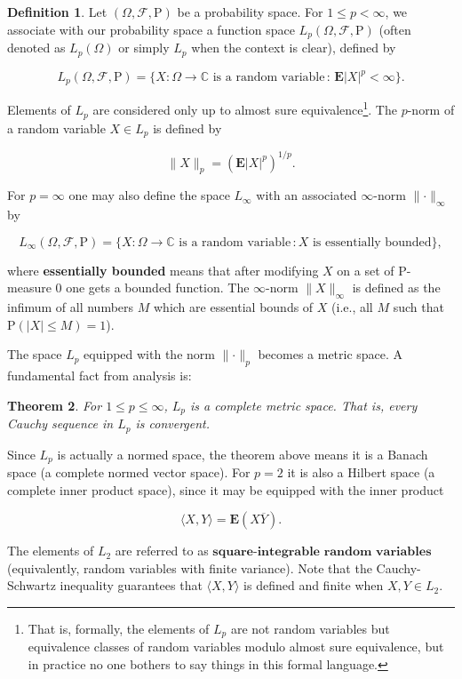 \documentclass[11pt]{report}
\theoremstyle{plain}
\newtheorem{thm}{Theorem}[chapter]
\theoremstyle{definition}
\newtheorem{defn}[thm]{Definition}
\begin{document}
\begin{defn}
Let $(\Omega, \mathcal{F}, \mathrm{P})$ be a probability space. For $1\le p<\infty$, we associate with our probability space a function space $L_p(\Omega, \mathcal{F}, \mathrm{P})$ (often denoted as $L_p(\Omega)$ or simply $L_p$ when the context is clear), defined by

\[
L_p(\Omega, \mathcal{F}, \mathrm{P}) = \{ X:\Omega\to\mathbb{C}\textrm{ is a random variable}\,:\, \mathbf{E}|X|^p < \infty \}.
\]

Elements of $L_p$ are considered only up to almost sure equivalence\footnote{That is, formally, the elements of $L_p$ are not random variables but equivalence classes of random variables modulo almost sure equivalence, but in practice no one bothers to say things in this formal language.}. The $p$-norm of a random variable $X\in L_p$ is defined by

\[
\lVert X\rVert_p = \left( \mathbf{E} |X|^p\right)^{1/p}.
\]

For $p=\infty$ one may also define the space $L_\infty$ with an associated $\infty$-norm $\lVert\cdot\rVert_\infty$ by

\[
L_\infty(\Omega,\mathcal{F},\mathrm{P}) = \{ X:\Omega\to\mathbb{C}\textrm{ is a random variable}\,: X\textrm{ is essentially bounded} \},
\]

where \textbf{essentially bounded} means that after modifying $X$ on a set of $\mathrm{P}$-measure $0$ one gets a bounded function. The $\infty$-norm $\lVert X\rVert_\infty$ is defined as the infimum of all numbers $M$ which are essential bounds of $X$ (i.e., all $M$ such that $\mathrm{P}(|X|\le M)=1$).
\end{defn}

The space $L_p$ equipped with the norm $\lVert \cdot \rVert_p$ becomes a metric space. A fundamental fact from analysis is:

\begin{thm}
For $1\le p\le \infty$, $L_p$ is a complete metric space. That is, every Cauchy sequence in $L_p$ is convergent.
\end{thm}

Since $L_p$ is actually a normed space, the theorem above means it is a Banach space (a complete normed vector space). For $p=2$ it is also a Hilbert space (a complete inner product space), since it may be equipped with the inner product

\[
\langle X,Y\rangle = \mathbf{E}(X\overline{Y}).
\]

The elements of $L_2$ are referred to as $\textbf{square-integrable random variables}$ (equivalently, random variables with finite variance). Note that the Cauchy-Schwartz inequality guarantees that $\langle X,Y\rangle$ is defined and finite when $X,Y\in L_2$.
\end{document}
